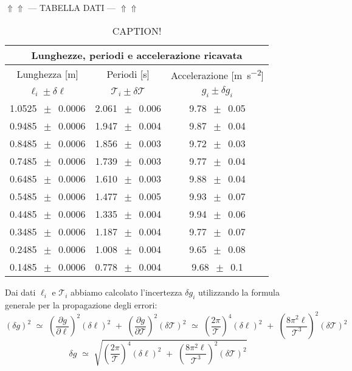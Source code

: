 \begin{center}
$\Uparrow\Uparrow$ --- TABELLA DATI --- $\Uparrow\Uparrow$
\end{center}

\begin{table}
    \centering
    \begin{tabular}{c c c}
        \multicolumn{3}{c}{\textbf{Lunghezze, periodi e accelerazione ricavata}} \\
        \toprule
        Lunghezza [\si{\metre}] & Periodi [\si{\second}] & Accelerazione [\si{\metre\per\square\second}] \\ %
        $\ell_i \pm \delta\ell$ & $\mathcal{T}_i \pm \delta\mathcal{T}$ & $g_i \pm \delta g_i$ \\
        \midrule
			1.0525 $\,\pm\,$ 0.0006 & 2.061 $\,\pm\,$ 0.006 & 9.78 $\,\pm\,$ 0.05 \\
			0.9485 $\,\pm\,$ 0.0006 & 1.947 $\,\pm\,$ 0.004 & 9.87 $\,\pm\,$ 0.04 \\
			0.8485 $\,\pm\,$ 0.0006 & 1.856 $\,\pm\,$ 0.003 & 9.72 $\,\pm\,$ 0.03 \\
			0.7485 $\,\pm\,$ 0.0006 & 1.739 $\,\pm\,$ 0.003 & 9.77 $\,\pm\,$ 0.04 \\
			0.6485 $\,\pm\,$ 0.0006 & 1.610 $\,\pm\,$ 0.003 & 9.88 $\,\pm\,$ 0.04 \\
			0.5485 $\,\pm\,$ 0.0006 & 1.477 $\,\pm\,$ 0.005 & 9.93 $\,\pm\,$ 0.07 \\
			0.4485 $\,\pm\,$ 0.0006 & 1.335 $\,\pm\,$ 0.004 & 9.94 $\,\pm\,$ 0.06 \\
			0.3485 $\,\pm\,$ 0.0006 & 1.187 $\,\pm\,$ 0.004 & 9.77 $\,\pm\,$ 0.07 \\
			0.2485 $\,\pm\,$ 0.0006 & 1.008 $\,\pm\,$ 0.004 & 9.65 $\,\pm\,$ 0.08 \\
			0.1485 $\,\pm\,$ 0.0006 & 0.778 $\,\pm\,$ 0.004 & 9.68 $\,\pm\,$ 0.1 \\
        \bottomrule
    \end{tabular}
    \caption{CAPTION!}
    \label{tab:calcolo_g}
\end{table}

Dai dati $\ell_i$ e $\mathcal{T}_i$ abbiamo calcolato l'incertezza $\delta g_i$ utilizzando la formula generale per la propagazione degli errori:
\begin{equation*}
(\delta g)^2 \,\, \simeq \,\, \left( \frac{\partial g}{\partial \ell} \right)^2 (\delta \ell)^2 \,\, + \,\, \left( \frac{\partial g}{\partial \mathcal{T}} \right)^2 (\delta \mathcal{T})^2 \,\, \simeq \,\, \left( \frac{2 \pi}{\mathcal{T}} \right)^4 (\delta \ell)^2 \,\, + \,\, \left( \frac{8 \pi^2 \ell}{\mathcal{T}^3} \right)^2 (\delta \mathcal{T})^2
\end{equation*}
\begin{equation} \label{eq:delta_g}
\delta g \,\, \simeq \,\, \sqrt{\left( \frac{2 \pi}{\mathcal{T}} \right)^4 (\delta \ell)^2 \,\, + \,\, \left( \frac{8 \pi^2 \ell}{\mathcal{T}^3} \right)^2 (\delta \mathcal{T})^2}
\end{equation}

